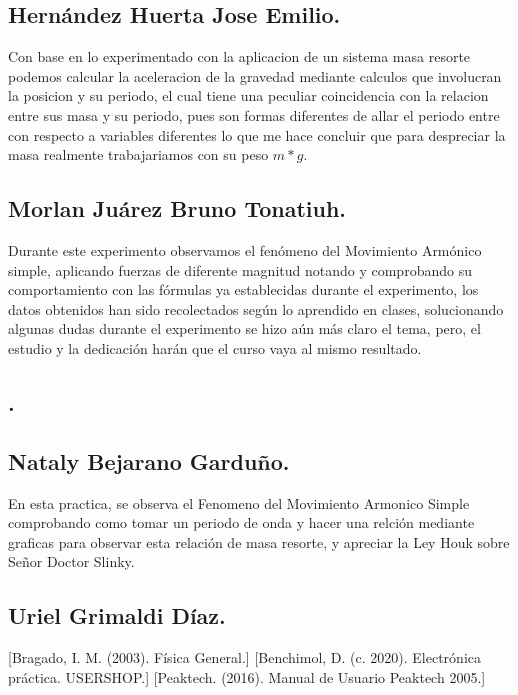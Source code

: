 \documentclass[10pt]{article}
\begin{document}
\begin{multicols}{2}
\subsection*{Hernández Huerta Jose Emilio.}
Con base en lo experimentado con la aplicacion de un sistema masa resorte podemos calcular la aceleracion de la gravedad mediante calculos que involucran la posicion y su periodo, el cual tiene una peculiar coincidencia con la relacion entre sus masa y su periodo, pues son formas diferentes de allar el periodo entre con respecto a variables diferentes lo que me hace concluir que para despreciar la masa realmente trabajariamos con su peso $m*g$.
\subsection*{Morlan Juárez Bruno Tonatiuh.}
Durante este experimento observamos el fenómeno del Movimiento Armónico simple, aplicando fuerzas de diferente magnitud notando y comprobando su comportamiento con las fórmulas ya establecidas durante el experimento, los datos obtenidos han sido recolectados según lo aprendido en clases, solucionando algunas dudas durante el experimento se hizo aún más claro el tema, pero, el estudio y la dedicación harán que el curso vaya al mismo resultado. 
\subsection*{.}

\subsection*{Nataly Bejarano Garduño.}
En esta practica, se observa el Fenomeno del Movimiento Armonico Simple comprobando como tomar un periodo de onda y hacer una relción mediante graficas para observar esta relación de masa resorte, y apreciar la Ley Houk sobre Señor Doctor Slinky. 


\subsection*{Uriel Grimaldi Díaz.}
\begin{thebibliography}{0}
	[Bragado, I. M. (2003). Física General.]
	[Benchimol, D. (c. 2020). Electrónica práctica. USERSHOP.]
	[Peaktech. (2016). Manual de Usuario Peaktech 2005.]
		
\end{thebibliography}

\end{multicols}
\end{document}
